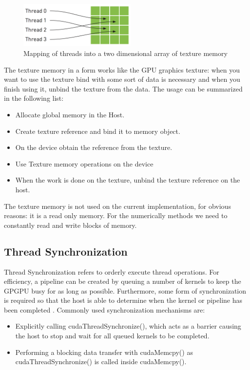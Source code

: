 \begin{figure}[htbp]
	\centering
		\includegraphics[width=0.52\textwidth]{Figures/texture.png}
		\smallskip
	\caption[Texture Memory]{Mapping of threads into a two dimensional array of texture memory \cite{hwu}}
	\label{fig:texture}
\end{figure}

The texture memory in a form works like the GPU graphics texture: when you want to use the texture bind with some sort of data is necessary and when you finish using it, unbind the texture from the data. The usage can be summarized in the following list:

\begin{itemize}
\item Allocate global memory in the Host.
\item Create texture reference and bind it to memory object.
\item On the device obtain the reference from the texture.
\item  Use Texture memory operations on the device
\item  When the work is done on the texture, unbind the texture reference on the host.
\end{itemize}

The texture memory is not used on the current implementation, for obvious reasons: it is a read only memory. For the numerically methods we need to constantly read and write blocks of memory.

\subsection{Thread Synchronization}

Thread Synchronization refers to orderly execute thread operations. For efficiency, a pipeline can be created by queuing a number of kernels to keep the GPGPU busy for as long as possible. Furthermore, some form of synchronization is required so that the host is able to determine when the kernel or pipeline has been completed \cite{design}. Commonly used synchronization mechanisms are:

\begin{itemize}
  \item Explicitly calling {\listf cudaThreadSynchronize()}, which acts as a barrier causing the host to stop and wait for all queued kernels to be completed.
  \item Performing a blocking data transfer with {\listf cudaMemcpy()} as {\listf cudaThreadSynchronize()} is called inside {\listf cudaMemcpy()}.
\end{itemize}

